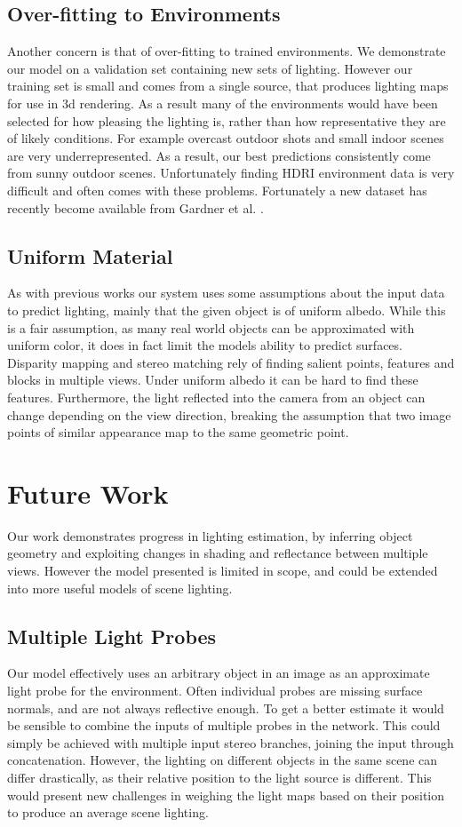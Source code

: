\documentclass[ %
                    author={Gavin Parker},
                supervisor={Dr. Neill Campbell},
                    degree={MEng},
                     title={Deep Learning for Illumination Estimation from Stereo Images},
                  subtitle={},
                      type={Research},
                      year={2018} ]{dissertation}
\begin{document}
\subsection{Over-fitting to Environments}
Another concern is that of over-fitting to trained environments. We demonstrate our model on a validation set containing new sets of lighting. However our training set is small and comes from a single source, that produces lighting maps for use in 3d rendering. As a result many of the environments would have been selected for how pleasing the lighting is, rather than how representative they are of likely conditions. For example overcast outdoor shots and small indoor scenes are very underrepresented. As a result, our best predictions consistently come from sunny outdoor scenes. Unfortunately finding HDRI environment data is very difficult and often comes with these problems. Fortunately a new dataset has recently become available from Gardner et al. \cite{gardner-sigasia-17}.
\subsection{Uniform Material}
As with previous works our system uses some assumptions about the input data to predict lighting, mainly that the given object is of uniform albedo. While this is a fair assumption, as many real world objects can be approximated with uniform color, it does in fact limit the models ability to predict surfaces. Disparity mapping and stereo matching rely of finding salient points, features and blocks in multiple views. Under uniform albedo it can be hard to find these features. Furthermore, the light reflected into the camera from an object can change depending on the view direction, breaking the assumption that two image points of similar appearance map to the same geometric point.
\section{Future Work}
Our work demonstrates progress in lighting estimation, by inferring object geometry and exploiting changes in shading and reflectance between multiple views. However the model presented is limited in scope, and could be extended into more useful models of scene lighting.
\subsection{Multiple Light Probes}
Our model effectively uses an arbitrary object in an image as an approximate light probe for the environment. Often individual probes are missing surface normals, and are not always reflective enough. To get a better estimate it would be sensible to combine the inputs of multiple probes in the network. This could simply be achieved with multiple input stereo branches, joining the input through concatenation. However, the lighting on different objects in the same scene can differ drastically, as their relative position to the light source is different. This would present new challenges in weighing the light maps based on their position to produce an average scene lighting.
\end{document}

